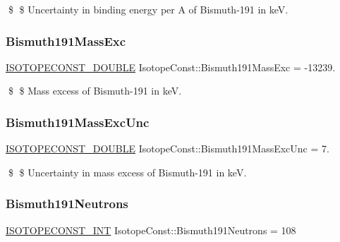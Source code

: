 \$ \$ Uncertainty in binding energy per A of Bismuth-\/191 in keV. \mbox{\label{group___isotope_const-_bismuth-_bi191_ga8ebf256047a89869e9ee5e7b75e98cb8}} 
\subsubsection{\texorpdfstring{Bismuth191\+Mass\+Exc}{Bismuth191MassExc}}
{\footnotesize\ttfamily \mbox{\hyperlink{group___isotope_const-_macros_ga8f45a7272ce02c0b4c65c44636ed719a}{I\+S\+O\+T\+O\+P\+E\+C\+O\+N\+S\+T\+\_\+\+D\+O\+U\+B\+LE}} Isotope\+Const\+::\+Bismuth191\+Mass\+Exc = -\/13239.}

\$ \$ Mass excess of Bismuth-\/191 in keV. \mbox{\label{group___isotope_const-_bismuth-_bi191_ga5f05819a0536f6f0522ace6eee58fc10}} 
\subsubsection{\texorpdfstring{Bismuth191\+Mass\+Exc\+Unc}{Bismuth191MassExcUnc}}
{\footnotesize\ttfamily \mbox{\hyperlink{group___isotope_const-_macros_ga8f45a7272ce02c0b4c65c44636ed719a}{I\+S\+O\+T\+O\+P\+E\+C\+O\+N\+S\+T\+\_\+\+D\+O\+U\+B\+LE}} Isotope\+Const\+::\+Bismuth191\+Mass\+Exc\+Unc = 7.}

\$ \$ Uncertainty in mass excess of Bismuth-\/191 in keV. \mbox{\label{group___isotope_const-_bismuth-_bi191_gaf8048c100636cfb1b13b5b9bfdb469e4}} 
\subsubsection{\texorpdfstring{Bismuth191\+Neutrons}{Bismuth191Neutrons}}
{\footnotesize\ttfamily \mbox{\hyperlink{group___isotope_const-_macros_ga5f18360b3e99483a35c32d789e62621c}{I\+S\+O\+T\+O\+P\+E\+C\+O\+N\+S\+T\+\_\+\+I\+NT}} Isotope\+Const\+::\+Bismuth191\+Neutrons = 108}

